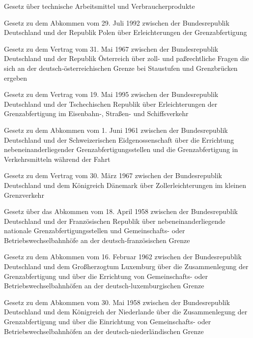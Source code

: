 \item[{GPSG}] Gesetz über technische Arbeitsmittel und Verbraucherprodukte

\item[{GrAbfErlPolAbkG}] Gesetz zu dem Abkommen vom 29. Juli 1992 zwischen der Bundesrepublik Deutschland und der Republik Polen über Erleichterungen der Grenzabfertigung

\item[{GrAbfertAUTVtrG-1967}] Gesetz zu dem Vertrag vom 31. Mai 1967 zwischen der Bundesrepublik Deutschland und der Republik Österreich über zoll- und paßrechtliche Fragen die sich an der deutsch-österreichischen Grenze bei Staustufen und Grenzbrücken ergeben

\item[{GrAbfertCESVtrG}] Gesetz zu dem Vertrag vom 19. Mai 1995 zwischen der Bundesrepublik Deutschland und der Tschechischen Republik über Erleichterungen der Grenzabfertigung im Eisenbahn-, Straßen- und Schiffsverkehr

\item[{GrAbfertCHEAbkG}] Gesetz zu dem Abkommen vom 1. Juni 1961 zwischen der Bundesrepublik Deutschland und der Schweizerischen Eidgenossenschaft über die Errichtung nebeneinanderliegender Grenzabfertigungsstellen und die Grenzabfertigung in Verkehrsmitteln während der Fahrt

\item[{GrAbfertDNKVtrG}] Gesetz zu dem Vertrag vom 30. März 1967 zwischen der Bundesrepublik Deutschland und dem Königreich Dänemark über Zollerleichterungen im kleinen Grenzverkehr

\item[{GrAbfertFRAAbkG}] Gesetz über das Abkommen vom 18. April 1958 zwischen der Bundesrepublik Deutschland und der Französischen Republik über nebeneinanderliegende nationale Grenzabfertigungsstellen und Gemeinschafts- oder Betriebswechselbahnhöfe an der deutsch-französischen Grenze

\item[{GrAbfertLUXAbkG}] Gesetz zu dem Abkommen vom 16. Februar 1962 zwischen der Bundesrepublik Deutschland und dem Großherzogtum Luxemburg über die Zusammenlegung der Grenzabfertigung und über die Errichtung von Gemeinschafts- oder Betriebswechselbahnhöfen an der deutsch-luxemburgischen Grenze

\item[{GrAbfertNLDAbkG}] Gesetz zu dem Abkommen vom 30. Mai 1958 zwischen der Bundesrepublik Deutschland und dem Königreich der Niederlande über die Zusammenlegung der Grenzabfertigung und über die Einrichtung von Gemeinschafts- oder Betriebswechselbahnhöfen an der deutsch-niederländischen Grenze

